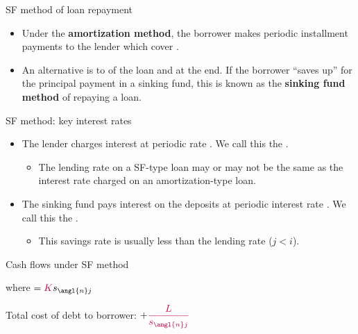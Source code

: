 \documentclass{beamer}
\begin{document}
\begin{frame}{SF method of loan repayment}

\begin{itemize}
\item Under the \textbf{amortization method}, the borrower makes periodic installment payments to the lender which cover .
\bigskip
\item An alternative is to  of the loan and  at the end. If the borrower ``saves up'' for the principal payment in a sinking fund, this is known as the \textbf{sinking fund method} of repaying a loan.
\end{itemize}

\end{frame}

\begin{frame}{SF method: key interest rates}

\begin{itemize}
\item The lender charges interest at periodic rate . We call this the .
  \begin{itemize}
  \item The lending rate on a SF-type loan may or may not be the same as the interest rate charged on an amortization-type loan.
  \end{itemize}
\medskip
\item The sinking fund pays interest on the deposits at periodic interest rate . We call this the .
  \begin{itemize}
  \item This savings rate is usually less than the lending rate ($j < i$).
  \end{itemize}
\end{itemize}

\end{frame}

\begin{frame}{Cash flows under SF method}

\begin{center}
\end{center}

where  $= \purple{K} s_{\angl{n}j}$

\bigskip
Total cost of debt to borrower:  $+ \purple{\dfrac{L}{s_{\angl{n}j}}}$

\end{frame}
\end{document}
